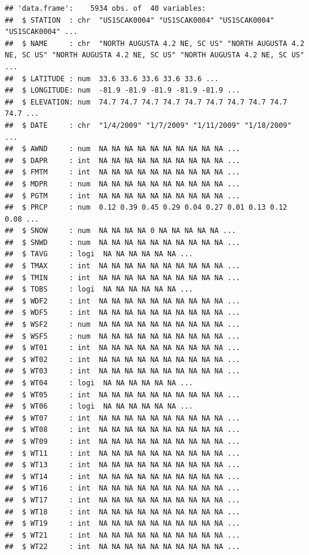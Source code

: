 \documentclass[
]{article}
\newenvironment{Shaded}{\begin{snugshade}}{\end{snugshade}}
\newcommand{\CommentTok}[1]{\textcolor[rgb]{0.56,0.35,0.01}{\textit{#1}}}
\newcommand{\FunctionTok}[1]{\textcolor[rgb]{0.13,0.29,0.53}{\textbf{#1}}}
\newcommand{\NormalTok}[1]{#1}
\newcommand{\SpecialCharTok}[1]{\textcolor[rgb]{0.81,0.36,0.00}{\textbf{#1}}}
\begin{document}
\begin{verbatim}
## 'data.frame':    5934 obs. of  40 variables:
##  $ STATION  : chr  "US1SCAK0004" "US1SCAK0004" "US1SCAK0004" "US1SCAK0004" ...
##  $ NAME     : chr  "NORTH AUGUSTA 4.2 NE, SC US" "NORTH AUGUSTA 4.2 NE, SC US" "NORTH AUGUSTA 4.2 NE, SC US" "NORTH AUGUSTA 4.2 NE, SC US" ...
##  $ LATITUDE : num  33.6 33.6 33.6 33.6 33.6 ...
##  $ LONGITUDE: num  -81.9 -81.9 -81.9 -81.9 -81.9 ...
##  $ ELEVATION: num  74.7 74.7 74.7 74.7 74.7 74.7 74.7 74.7 74.7 74.7 ...
##  $ DATE     : chr  "1/4/2009" "1/7/2009" "1/11/2009" "1/18/2009" ...
##  $ AWND     : num  NA NA NA NA NA NA NA NA NA NA ...
##  $ DAPR     : int  NA NA NA NA NA NA NA NA NA NA ...
##  $ FMTM     : int  NA NA NA NA NA NA NA NA NA NA ...
##  $ MDPR     : num  NA NA NA NA NA NA NA NA NA NA ...
##  $ PGTM     : int  NA NA NA NA NA NA NA NA NA NA ...
##  $ PRCP     : num  0.12 0.39 0.45 0.29 0.04 0.27 0.01 0.13 0.12 0.08 ...
##  $ SNOW     : num  NA NA NA NA 0 NA NA NA NA NA ...
##  $ SNWD     : num  NA NA NA NA NA NA NA NA NA NA ...
##  $ TAVG     : logi  NA NA NA NA NA NA ...
##  $ TMAX     : int  NA NA NA NA NA NA NA NA NA NA ...
##  $ TMIN     : int  NA NA NA NA NA NA NA NA NA NA ...
##  $ TOBS     : logi  NA NA NA NA NA NA ...
##  $ WDF2     : int  NA NA NA NA NA NA NA NA NA NA ...
##  $ WDF5     : int  NA NA NA NA NA NA NA NA NA NA ...
##  $ WSF2     : num  NA NA NA NA NA NA NA NA NA NA ...
##  $ WSF5     : num  NA NA NA NA NA NA NA NA NA NA ...
##  $ WT01     : int  NA NA NA NA NA NA NA NA NA NA ...
##  $ WT02     : int  NA NA NA NA NA NA NA NA NA NA ...
##  $ WT03     : int  NA NA NA NA NA NA NA NA NA NA ...
##  $ WT04     : logi  NA NA NA NA NA NA ...
##  $ WT05     : int  NA NA NA NA NA NA NA NA NA NA ...
##  $ WT06     : logi  NA NA NA NA NA NA ...
##  $ WT07     : int  NA NA NA NA NA NA NA NA NA NA ...
##  $ WT08     : int  NA NA NA NA NA NA NA NA NA NA ...
##  $ WT09     : int  NA NA NA NA NA NA NA NA NA NA ...
##  $ WT11     : int  NA NA NA NA NA NA NA NA NA NA ...
##  $ WT13     : int  NA NA NA NA NA NA NA NA NA NA ...
##  $ WT14     : int  NA NA NA NA NA NA NA NA NA NA ...
##  $ WT16     : int  NA NA NA NA NA NA NA NA NA NA ...
##  $ WT17     : int  NA NA NA NA NA NA NA NA NA NA ...
##  $ WT18     : int  NA NA NA NA NA NA NA NA NA NA ...
##  $ WT19     : int  NA NA NA NA NA NA NA NA NA NA ...
##  $ WT21     : int  NA NA NA NA NA NA NA NA NA NA ...
##  $ WT22     : int  NA NA NA NA NA NA NA NA NA NA ...
\end{verbatim}

\begin{Shaded}
\end{Shaded}
\end{document}
